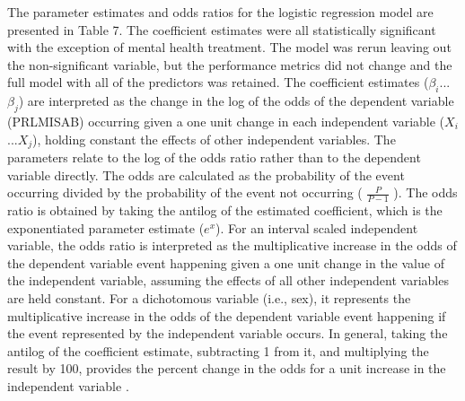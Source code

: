 \documentclass[sigconf]{acmart}
\begin{document}
The parameter estimates and odds ratios for the logistic regression model 
are presented in Table 7. The coefficient estimates were all statistically 
significant with the exception of mental health treatment. The model was 
rerun leaving out the non-significant variable, but the performance metrics 
did not change and the full model with all of the predictors was retained. 
The coefficient estimates ($\beta_i$...$\beta_j$) are interpreted as the 
change in the log of the odds of the dependent variable (PRLMISAB) occurring 
given a one unit change in each independent variable ($X_i$...$X_j$), holding
constant the effects of other independent variables. The parameters relate to 
the log of the odds ratio rather than to the dependent variable directly. 
The odds are calculated as the probability of the event occurring divided 
by the probability of the event not occurring ( \(\frac{P}{P-1}\) ). The 
odds ratio is obtained by taking the antilog of the estimated coefficient, 
which is the exponentiated parameter estimate ($e^x$). For an interval scaled 
independent variable, the odds ratio is interpreted as the multiplicative 
increase in the odds of the dependent variable event happening given a 
one unit change in the value of the independent variable, assuming the 
effects of all other independent variables are held constant. For a 
dichotomous variable (i.e., sex), it represents the multiplicative increase 
in the odds of the dependent variable event happening if the event
represented by the independent variable occurs. In general, taking the 
antilog of the coefficient estimate, subtracting 1 from it, and multiplying 
the result by 100, provides the percent change in the odds for a unit 
increase in the independent variable  \cite{gujarati09}.  

\end{document}
